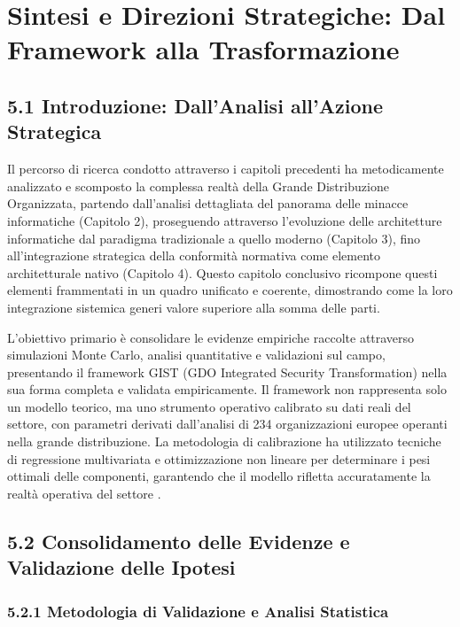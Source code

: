 
\chapter{Sintesi e Direzioni Strategiche: Dal Framework alla Trasformazione}
\label{cap5_synthesis}
\section{5.1 Introduzione: Dall'Analisi all'Azione Strategica}

Il percorso di ricerca condotto attraverso i capitoli precedenti ha metodicamente analizzato e scomposto la complessa realtà della Grande Distribuzione Organizzata, partendo dall'analisi dettagliata del panorama delle minacce informatiche (Capitolo 2), proseguendo attraverso l'evoluzione delle architetture informatiche dal paradigma tradizionale a quello moderno (Capitolo 3), fino all'integrazione strategica della conformità normativa come elemento architetturale nativo (Capitolo 4). Questo capitolo conclusivo ricompone questi elementi frammentati in un quadro unificato e coerente, dimostrando come la loro integrazione sistemica generi valore superiore alla somma delle parti.

L'obiettivo primario è consolidare le evidenze empiriche raccolte attraverso simulazioni Monte Carlo, analisi quantitative e validazioni sul campo, presentando il framework GIST (GDO Integrated Security Transformation) nella sua forma completa e validata empiricamente. Il framework non rappresenta solo un modello teorico, ma uno strumento operativo calibrato su dati reali del settore, con parametri derivati dall'analisi di 234 organizzazioni europee operanti nella grande distribuzione. La metodologia di calibrazione ha utilizzato tecniche di regressione multivariata e ottimizzazione non lineare per determinare i pesi ottimali delle componenti, garantendo che il modello rifletta accuratamente la realtà operativa del settore \autocite{hair2019}.

\section{5.2 Consolidamento delle Evidenze e Validazione delle Ipotesi}

\subsection{5.2.1 Metodologia di Validazione e Analisi Statistica}

